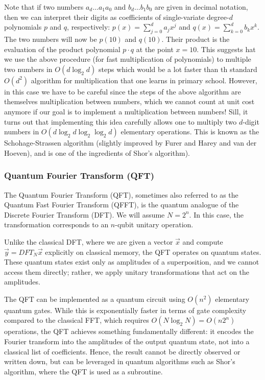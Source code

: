 Note that if two numbers $a_d \ldots a_1a_0$ and $b_d\ldots b_1b_0$ are given in decimal notation, then we can interpret their digits as coefficients of single-variate degree-$d$ polynomials $p$ and $q$, respectively: $p(x)=\sum_{j=0}^d a_jx^j$ and $q(x)=\sum_{k=0}^d b_kx^k$. The two numbers will now be $p(10)$ and $q(10)$. Their product is the evaluation of the product polynomial $p\cdot q$ at the point $x=10$. This suggests hat we use the above procedure (for fast multiplication of polynomials) to multiple two numbers in $O(d\log_2d)$ steps which would be a lot faster than th standard $O(d^2)$ algorithm for multiplication that one learns in primary school. However, in this case we have to be careful since the steps of the above algorithm are themselves multiplication between numbers, which we cannot count at unit cost anymore if our goal is to implement a multiplication between numbers! Sill, it turns out that implementing this idea carefully allows one to multiply two $d$-digit numbers in $O(d\log_2 d\log_2 \log_2 d)$ elementary operations. This is known as the Schohage-Strassen algorithm (slightly improved by Furer and Harey and van der Hoeven), and is one of the ingredients of Shor's algorithm).

\subsubsection{Quantum Fourier Transform (QFT)}

The Quantum Fourier Transform (QFT), sometimes also referred to as the Quantum Fast Fourier Transform (QFFT), is the quantum analogue of the Discrete Fourier Transform (DFT). We will assume $N = 2^n$. In this case, the transformation corresponds to an $n$-qubit unitary operation.

Unlike the classical DFT, where we are given a vector $\vec{x}$ and compute $\vec{y} = DFT_N \vec{x}$ explicitly on classical memory, the QFT operates on quantum states. These quantum states exist only as amplitudes of a superposition, and we cannot access them directly; rather, we apply unitary transformations that act on the amplitudes.

The QFT can be implemented as a quantum circuit using $O(n^2)$ elementary quantum gates. While this is exponentially faster in terms of gate complexity compared to the classical FFT, which requires $O(N \log_2 N) = O(n 2^n)$ operations, the QFT achieves something fundamentally different: it encodes the Fourier transform into the amplitudes of the output quantum state, not into a classical list of coefficients. Hence, the result cannot be directly observed or written down, but can be leveraged in quantum algorithms such as Shor’s algorithm, where the QFT is used as a subroutine.

